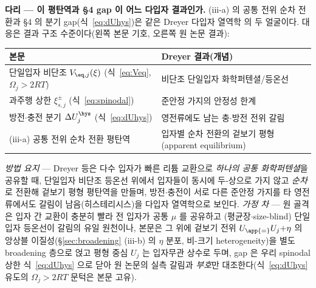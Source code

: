 
\begin{srcbox}
\textbf{다리 --- 이 평탄역과 §4 gap 이 어느 다입자 결과인가.} (iii-a) 의 공통 전위 순차 전환과 §4 의 분기
gap(식~\eqref{eq:dUhys})은 같은 Dreyer 다입자 열역학\cite{dreyer2010,dreyer2011} 의 두 얼굴이다. 대응은
결과 구조 수준이다(왼쪽 본문 기호, 오른쪽 원 논문 결과):
\begin{center}\footnotesize
\begin{tabular}{@{}ll@{}}
\hline
본문 & Dreyer\cite{dreyer2010,dreyer2011} 결과(개념) \\
\hline
단일입자 비단조 $V_{\eq,j}(\xi)$ (식~\eqref{eq:Veq}, $\Omega_j{>}2RT$) & 비단조 단일입자 화학퍼텐셜/등온선 \\
과주행 상한 $\xi_{s,j}^\pm$ (식~\eqref{eq:spinodal}) & 준안정 가지의 안정성 한계 \\
방전$\cdot$충전 분기 $\Delta U_j^\hys$ (식~\eqref{eq:dUhys}) & 영전류에도 남는 충$\cdot$방전 전위 갈림 \\
(iii-a) 공통 전위 순차 전환 평탄역 & 입자별 순차 전환의 겉보기 평형(apparent equilibrium) \\
\hline
\end{tabular}
\end{center}
\emph{방법 요지} --- Dreyer 등은 다수 입자가 빠른 리튬 교환으로 \emph{하나의 공통 화학퍼텐셜}을 공유할 때,
단일입자 비단조 등온선 위에서 입자들이 동시에 두-상으로 가지 않고 \emph{순차}로 전환해 겉보기 평형 평탄역을
만들며, 방전$\cdot$충전이 서로 다른 준안정 가지를 타 영전류에서도 갈림이 남음(히스테리시스)을 다입자
열역학으로 보인다. \emph{가정 차} --- 원 골격은 입자 간 교환이 충분히 빨라 전 입자가 공통 $\mu$ 를 공유하고
(평균장$\cdot$size-blind) 단일입자 등온선이 갈림의 유일 원천이나, 본문은 그 위에 겉보기 전위
$U_\app{=}U_j{+}\eta$ 의 앙상블 이질성(\S\ref{sec:broadening} (iii-b) 의 $\eta$ 분포, 비-크기
heterogeneity)을 별도 broadening 층으로 얹고 평형 중심 $U_j$ 는 입자무관 상수로 두며, gap 은 우리 spinodal
상한 식~\eqref{eq:dUhys} 으로 닫아 원 논문의 실측 갈림과 \emph{부호}만 대조한다(식~\eqref{eq:dUhys} 유도의
$\Omega_j{>}2RT$ 문턱은 본문 고유).
\end{srcbox}
